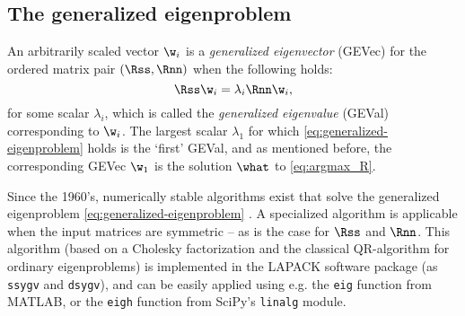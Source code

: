 \subsection{The generalized eigenproblem}
\label{sec:generalized-eigenproblem}

An arbitrarily scaled vector $\w_i$ is a \emph{generalized eigenvector} (GEVec) for the ordered matrix pair $(\Rss, \Rnn)$ when the following holds:
%
\begin{equation}
\label{eq:generalized-eigenproblem}
\Rss \w_i = \lambda_i \Rnn \w_i,
\end{equation}
%
for some scalar $\lambda_i$, which is called the \emph{generalized eigenvalue} (GEVal) corresponding to $\w_i$. The largest scalar $\lambda_1$ for which \cref{eq:generalized-eigenproblem} holds is the `first' GEVal, and as mentioned before, the corresponding GEVec $\w_1$ is the solution $\what$ to \cref{eq:argmax_R}.

Since the 1960's, numerically stable algorithms exist that solve the generalized eigenproblem \cref{eq:generalized-eigenproblem} \cite{Golub2013}. A specialized algorithm is applicable when the input matrices are symmetric -- as is the case for $\Rss$ and $\Rnn$. This algorithm (based on a Cholesky factorization and the classical QR-algorithm for ordinary eigenproblems) is implemented in the LAPACK software package (as \texttt{ssygv} and \texttt{dsygv}), and can be easily applied using e.g. the \texttt{eig} function from MATLAB, or the \texttt{eigh} function from SciPy's \texttt{linalg} module.
